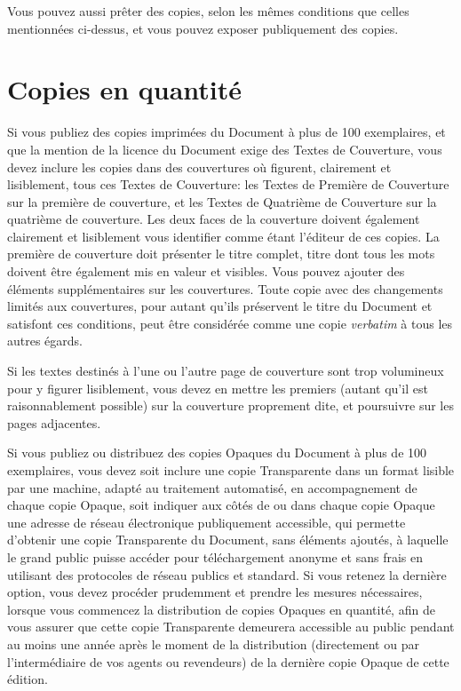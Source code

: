 Vous pouvez aussi prêter des copies, selon les mêmes conditions
que celles mentionnées ci-dessus, et vous pouvez exposer publiquement
des copies. 


\section{Copies en quantité} 

Si vous publiez des copies imprimées du Document à plus
de 100 exemplaires, et que la mention de la licence du Document exige
des Textes de Couverture, vous devez inclure les copies dans des couvertures
où figurent, clairement et lisiblement, tous ces Textes de Couverture:
les Textes de Première de Couverture sur la première de couverture,
et les Textes de Quatrième de Couverture sur la quatrième de couverture.
Les deux faces de la couverture doivent également clairement et lisiblement
vous identifier comme étant l'éditeur de ces copies. La première de
couverture doit présenter le titre complet, titre dont tous les mots
doivent être également mis en valeur et visibles. Vous pouvez ajouter
des éléments supplémentaires sur les couvertures. Toute copie avec
des changements limités aux couvertures, pour autant qu'ils préservent
le titre du Document et satisfont ces conditions, peut être considérée
comme une copie \emph{verbatim} à tous les autres égards. 

Si les textes destinés à l'une ou l'autre page de couverture
sont trop volumineux pour y figurer lisiblement, vous devez en mettre
les premiers (autant qu'il est raisonnablement possible) sur la couverture
proprement dite, et poursuivre sur les pages adjacentes. 

Si vous publiez ou distribuez des copies Opaques du Document
à plus de 100 exemplaires, vous devez soit inclure une copie Transparente
dans un format lisible par une machine, adapté au traitement automatisé,
en accompagnement de chaque copie Opaque, soit indiquer aux côtés
de ou dans chaque copie Opaque une adresse de réseau électronique
publiquement accessible, qui permette d'obtenir une copie Transparente
du Document, sans éléments ajoutés, à laquelle le grand public puisse
accéder pour téléchargement anonyme et sans frais en utilisant des
protocoles de réseau publics et standard. Si vous retenez la dernière
option, vous devez procéder prudemment et prendre les mesures nécessaires,
lorsque vous commencez la distribution de copies Opaques en quantité,
afin de vous assurer que cette copie Transparente demeurera accessible
au public pendant au moins une année après le moment de la distribution
(directement ou par l'intermédiaire de vos agents ou revendeurs) de
la dernière copie Opaque de cette édition. 

